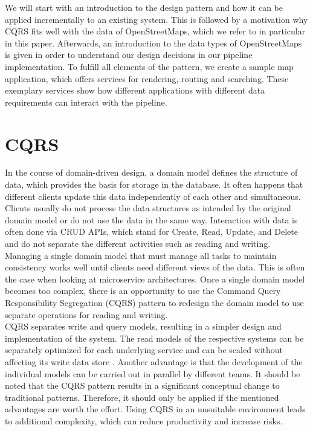 \documentclass[conference]{IEEEtran}
\begin{document}
We will start with an introduction to the design pattern and how it can be applied incrementally to an existing system. This is followed by a motivation why CQRS fits well with the data of OpenStreetMaps, which we refer to in particular in this paper. Afterwards, an introduction to the data types of OpenStreetMaps is given in order to understand our design decisions in our pipeline implementation.
To fulfill all elements of the pattern, we create a sample map application, which offers services for rendering, routing and searching. These exemplary services show how different applications with different data requirements can interact with the pipeline.


\section{CQRS}
\label{sec:cqrs}
In the course of domain-driven design, a domain model defines the structure of data, which provides the basis for storage in the database. It often happens that different clients update this data independently of each other and simultaneous. Clients usually do not process the data structures as intended by the original domain model or do not use the data in the same way.
Interaction with data is often done via CRUD APIs, which stand for Create, Read, Update, and Delete and do not separate the different activities such as reading and writing. Managing a single domain model that must manage all tasks to maintain consistency works well until clients need different views of the data. This is often the case when looking at microservice architectures.
Once a single domain model becomes too complex, there is an opportunity to use the Command Query Responsibility Segregation (CQRS) pattern to redesign the domain model to use separate operations for reading and writing. \cite{IBM_cqrs_2021}\\

CQRS separates write and query models, resulting in a simpler design and implementation of the system. The read models of the respective systems can be separately optimized for each underlying service and can be scaled without affecting its write data store \cite{noauthor_concepts_nodate}. Another advantage is that the development of the individual models can be carried out in parallel by different teams. It should be noted that the CQRS pattern results in a significant conceptual change to traditional patterns. Therefore, it should only be applied if the mentioned advantages are worth the effort. Using CQRS in an unsuitable environment leads to additional complexity, which can reduce productivity and increase risks. \cite{fowler_cqrs_2011}
\end{document}
